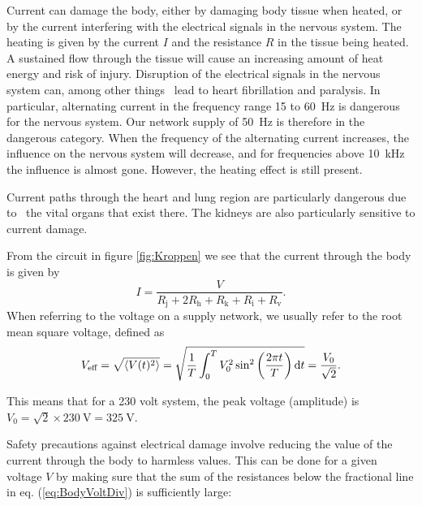 \documentclass[../Elmag-labhefte-2020.tex]{subfiles}
\begin{document}
Current can damage the body, either by damaging body tissue when heated, or by the current interfering with the electrical signals in the nervous system. The heating is given by the current $I$ and the resistance $R$ in the tissue being heated. A sustained flow through the tissue will cause an increasing amount of heat energy and risk of injury. Disruption of the electrical signals in the nervous system can, among other things \, lead to heart fibrillation and paralysis. In particular, alternating current in the frequency range \num{15} to \SI{60}{\hertz} is dangerous for the nervous system. Our network supply of \SI{50}{\hertz} is therefore in the dangerous category. When the frequency of the alternating current increases, the influence on the nervous system will decrease, and for frequencies above \SI{10}{\kilo\hertz} the influence is almost gone. However, the heating effect is still present.

Current paths through the heart and lung region are particularly dangerous due to \ the vital organs that exist there. The kidneys are also particularly sensitive to current damage.

From the circuit in figure \ref{fig:Kroppen} we see that the current through the body is given by
\begin{equation}
  I = \frac{V}{R_\text{j} + 2R_\text{h} + R_\text{k} + R_\text{i} + R_\text{v}}.
  \label{eq:BodyVoltDiv}
\end{equation}
When referring to the voltage on a supply network, we usually refer to the root mean square voltage, defined as
\begin{equation}
    V_\text{eff}
        = \sqrt{\langle V(t)^2 \rangle}
        = \sqrt{\frac{1}{T} \int_0^T V_0^2 \sin^2 \qty(\frac{2\pi t}{T}) \dd{t}}
        = \frac{V_0}{\sqrt{2}}.
    \label{eq:EffectiveV}
\end{equation}

This means that for a \num{230} volt system, the peak voltage (amplitude) is $V_0 = \sqrt{2} \times \SI{230}{\V} = \SI{325}{\V}$.

Safety precautions against electrical damage involve reducing the value of the current through the body to harmless values. This can be done for a given voltage $V$ by making sure that the sum of the resistances below the fractional line in eq. (\ref{eq:BodyVoltDiv}) is sufficiently large:
\end{document}
